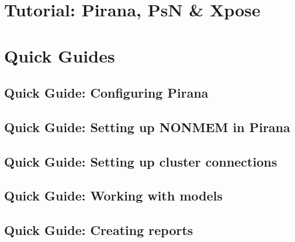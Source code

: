 \documentclass[9pt]{report}
\begin{document}
\normalsize

\newpage

\tableofcontents
\newpage  %
\thispagestyle{empty}
\mbox{}



\newpage  %
\thispagestyle{empty}
\mbox{}

\chapter{Tutorial: Pirana, PsN \& Xpose}




\clearpage
\chapter{Quick Guides}

\clearpage
\section{Quick Guide: Configuring Pirana }


\clearpage
\section{Quick Guide: Setting up NONMEM in Pirana}


\clearpage
\section{Quick Guide: Setting up cluster connections}


\clearpage
\section{Quick Guide: Working with models}


\clearpage
\section{Quick Guide: Creating reports}

\end{document}
